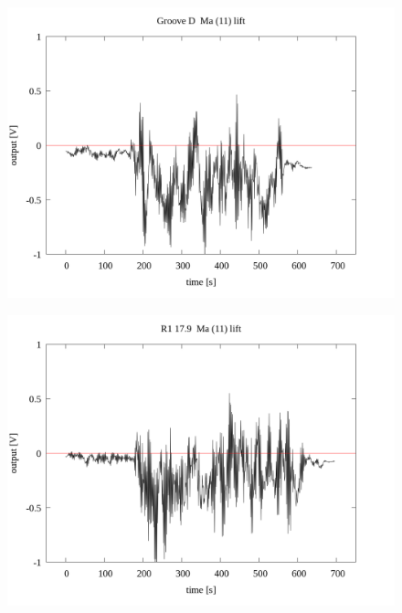 \documentclass[a4paper]{jsarticle}
\begin{document}
\begin{figure}[htbp]
    \footnotesize
    \begin{center}
        \includegraphics[width=140mm]{../../../33_result/210806/moving_average/11/lift/Groove_D_ma(11)_lift.png}
    \end{center}
\end{figure}

\begin{figure}[htbp]
    \footnotesize
    \begin{center}
        \includegraphics[width=140mm]{../../../33_result/210806/moving_average/11/lift/R1_17.9_ma(11)_lift.png}
    \end{center}
\end{figure}
\end{document}
